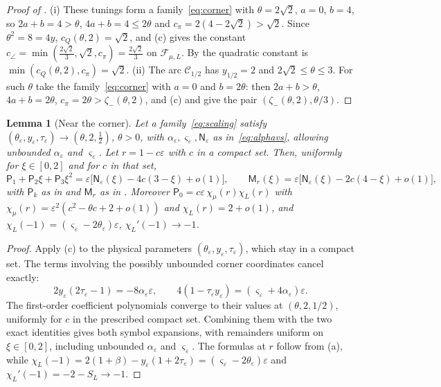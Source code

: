 \documentclass[11pt]{article}
\newtheorem{lemma}[theorem]{Lemma}
\theoremstyle{definition}
\theoremstyle{remark}
\newcommand{\cF}{\mathcal F}
\newcommand{\sfP}{\mathsf P}
\newcommand{\cQ}{c_{Q}}
\newcommand{\cpi}{c_{\pi}}
\newcommand{\ccorner}{c_{\angle}}
\begin{document}
\begin{proof}[Proof of ]
(i) These tunings form a family~\eqref{eq:corner} with \(\theta=2\sqrt2\), \(a=0\), \(b=4\), so
\(2a+b=4>\theta\), \(4a+b=4\le2\theta\) and \(\cpi=2(4-2\sqrt2)>\sqrt2\).  Since \(\theta^2=8=4y\),
\(\cQ(\theta,2)=\sqrt2\), and (c) gives the constant
\(\ccorner=\min(\frac{2\sqrt2}3,\sqrt2,\cpi)=\frac{2\sqrt2}3\) on \(\cF_{\mu,L}\).  By 
the quadratic constant is \(\min(\cQ(\theta,2),\cpi)=\sqrt2\).
(ii) The arc \(\mathcal C_{1/2}\) has \(y_{1/2}=2\) and \(2\sqrt2\le\theta\le3\).  For such \(\theta\) take the
family~\eqref{eq:corner} with \(a=0\) and \(b=2\theta\): then \(2a+b>\theta\), \(4a+b=2\theta\), \(\cpi=2\theta>\zeta_-(\theta,2)\), and
(c) and  give the pair \((\zeta_-(\theta,2),\theta/3)\).
\end{proof}

\begin{lemma}[Near the corner]\label{lem:nearcorner}
Let a family~\eqref{eq:scaling} satisfy
\((\theta_\varepsilon,y_\varepsilon,\tau_\varepsilon)\to(\theta,2,\frac12)\), \(\theta>0\),
with \(\alpha_\varepsilon,\varsigma_\varepsilon,\mathsf N_\varepsilon\) as in~\eqref{eq:alphavs},
allowing unbounded \(\alpha_\varepsilon\) and \(\varsigma_\varepsilon\).  Let
\(r=1-c\varepsilon\) with \(c\) in a compact set.  Then, uniformly for \(\xi\in[0,2]\) and for \(c\) in that set,
\[
\sfP_1+\sfP_2\xi+\sfP_3\xi^2=\varepsilon\bigl[\mathsf N_\varepsilon(\xi)-4c(3-\xi)+o(1)\bigr],\qquad
\mathsf M_r(\xi)=\varepsilon\bigl[\mathsf N_\varepsilon(\xi)-2c(4-\xi)+o(1)\bigr],
\]
with \(\sfP_k\) as in  and \(\mathsf M_r\) as in .  Moreover \(\sfP_0=c\varepsilon\,\chi_\mu(r)\chi_L(r)\)
with \(\chi_\mu(r)=\varepsilon^2(c^2-\theta c+2+o(1))\) and \(\chi_L(r)=2+o(1)\), and \(\chi_L(-1)=(\varsigma_\varepsilon-2\theta_\varepsilon)\varepsilon\), \(\chi_L'(-1)\to-1\).
\end{lemma}

\begin{proof}
Apply (c) to the physical parameters
\((\theta_\varepsilon,y_\varepsilon,\tau_\varepsilon)\), which stay in a compact set.
The terms involving the possibly unbounded corner coordinates cancel exactly:
\[
2y_\varepsilon(2\tau_\varepsilon-1)=-8\alpha_\varepsilon\varepsilon,
\qquad
4(1-\tau_\varepsilon y_\varepsilon)
=(\varsigma_\varepsilon+4\alpha_\varepsilon)\varepsilon.
\]
The first-order coefficient polynomials converge to their values at \((\theta,2,1/2)\),
uniformly for \(c\) in the prescribed compact set.  Combining them with the two exact identities
gives both symbol expansions, with remainders uniform on \(\xi\in[0,2]\), including
unbounded \(\alpha_\varepsilon\) and \(\varsigma_\varepsilon\).
The formulas at \(r\) follow from (a), while
\(\chi_L(-1)=2(1+\beta)-y_\varepsilon(1+2\tau_\varepsilon)
=(\varsigma_\varepsilon-2\theta_\varepsilon)\varepsilon\) and
\(\chi_L'(-1)=-2-S_L\to-1\).
\end{proof}
\end{document}
